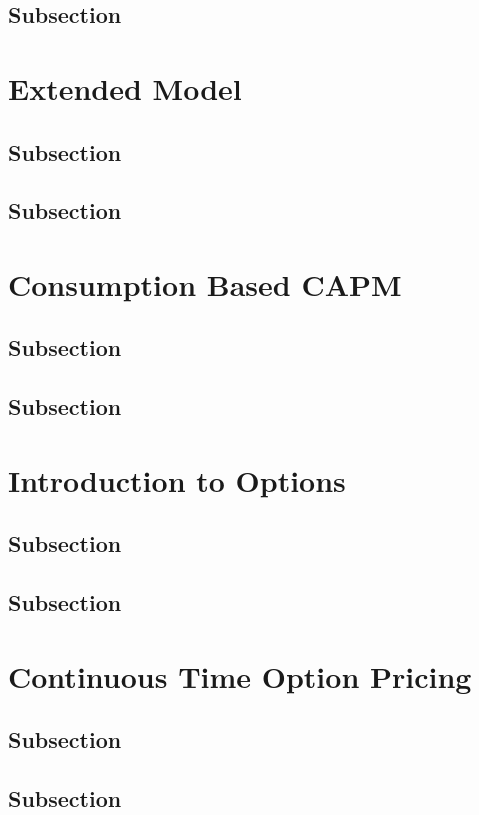 \documentclass[
14pt,notheorems,hyperref={pdfauthor=whatever}
]{beamer}
\begin{document}
\subsection{Subsection}

\section{Extended Model}
\subsection{Subsection}
\subsection{Subsection}

\section{Consumption Based CAPM}
\subsection{Subsection}
\subsection{Subsection}

\section{Introduction to Options}
\subsection{Subsection}
\subsection{Subsection}

\section{Continuous Time Option Pricing}
\subsection{Subsection}
\subsection{Subsection}
\end{document}
